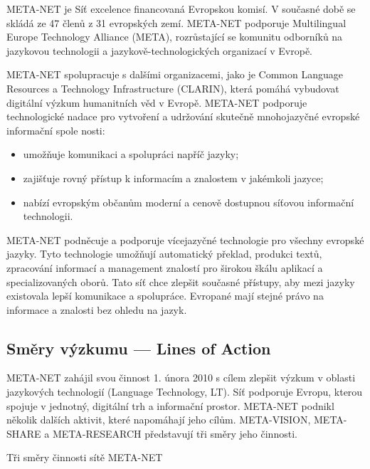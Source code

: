 \documentclass[]{../../metanetpaper}
\begin{document}
\begin{multicols}{2}

META-NET je Síť excelence financovaná Evropskou komisí. V současné době se skládá ze 47 členů z 31 evropských zemí. META-NET podporuje Multilingual Europe Technology Alliance (META), rozrůstající se komunitu odborníků na jazykovou technologii a jazykově-technologických organizací v Evropě.

META-NET spolupracuje s dalšími organizacemi, jako je Common Language Resources a Technology Infrastructure (CLARIN), která pomáhá vybudovat digitální výzkum humanitních věd v Evropě. META-NET podporuje technologické nadace pro vytvoření a udržování skutečně mnohojazyčné evropské informační spole
nosti:
    \begin{itemize}
      \item umožňuje komunikaci a spolupráci napříč jazyky;
      \item zajišťuje rovný přístup k informacím a znalostem v jakémkoli jazyce;
      \item nabízí evropským občanům moderní a cenově dostupnou síťovou informační technologii.
    \end{itemize}
META-NET podněcuje a podporuje vícejazyčné technologie pro všechny evropské jazyky. Tyto technologie umožňují automatický překlad, produkci textů, zpracování informací a management znalostí pro širokou škálu aplikací a specializovaných oborů. Tato síť chce zlepšit současné přístupy, aby mezi jazyky existovala lepší komunikace a spolupráce. Evropané mají stejné právo na informace a znalosti bez ohledu na jazyk.

\subsection{Směry výzkumu --- Lines of Action}

META-NET zahájil svou činnost 1. února 2010 s cílem zlepšit výzkum v oblasti jazykových technologií (Language Technology, LT). Síť podporuje Evropu, kterou spojuje v jednotný, digitální trh a informační prostor. META-NET podnikl několik dalších aktivit, které napomáhají jeho cílům. META-VISION, META-SHARE a META-RESEARCH představují tři směry jeho činnosti.

Tři směry činnosti sítě META-NET


\end{multicols}
\end{document}
